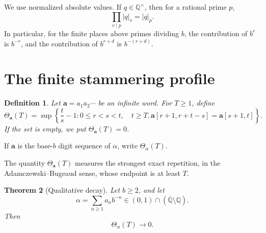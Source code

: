 \documentclass[11pt]{amsart}
\newtheorem{theorem}{Theorem}[section]
\newtheorem{definition}[theorem]{Definition}
\begin{document}
We use normalized absolute values. If \(q\in\mathbb Q^\times\), then for a rational prime \(p\),
\[
\prod_{v\mid p}|q|_v=|q|_p.
\]
In particular, for the finite places above primes dividing \(b\), the contribution of \(b^r\) is \(b^{-r}\), and the contribution of \(b^{r+d}\) is \(b^{-(r+d)}\).

\section{The finite stammering profile}

\begin{definition}
Let \(\mathbf a=a_1a_2\cdots\) be an infinite word. For \(T\geq 1\), define
\[
\Theta_{\mathbf a}(T)
=
\sup\left\{
\frac{t}{s}-1:
0\leq r<s<t,\quad t\geq T,
\mathbf a[r+1,r+t-s]=\mathbf a[s+1,t]
\right\}.
\]
If the set is empty, we put \(\Theta_{\mathbf a}(T)=0\).
\end{definition}

If \(\mathbf a\) is the base-\(b\) digit sequence of \(\alpha\), write \(\Theta_\alpha(T)\).

The quantity \(\Theta_{\mathbf a}(T)\) measures the strongest exact repetition, in the Adamczewski--Bugeaud sense, whose endpoint is at least \(T\).

\begin{theorem}[Qualitative decay]
Let \(b\geq 2\), and let
\[
\alpha=\sum_{n\geq 1}a_n b^{-n}
\in (0,1)\cap(\overline{\mathbb Q}\setminus\mathbb Q).
\]
Then
\[
\Theta_\alpha(T)\to 0.
\]
\end{theorem}
\end{document}
